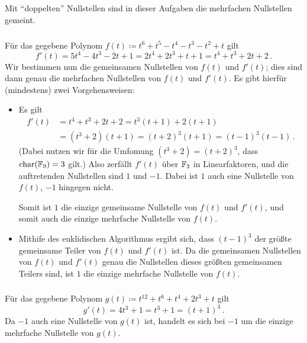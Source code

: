 \subsection{}

Mit \enquote{doppelten} Nullstellen sind in dieser Aufgaben die mehrfachen Nullstellen gemeint.



\subsubsection{}

Für das gegebene Polynom $f(t) \coloneqq t^6 + t^5 - t^4 - t^3 - t^2 + t$ gilt
\[
    f'(t)
  = 5 t^4 - 4 t^3 - 2 t + 1
  = 2 t^4 + 2 t^3 + t + 1
  = t^4 + t^3 + 2 t + 2 \,.
\]
Wir bestimmen nun die gemeinsamen Nullstellen von $f(t)$ und $f'(t)$;
dies sind dann genau die mehrfachen Nullstellen von $f(t)$ und $f'(t)$.
Es gibt hierfür (mindestens) zwei Vorgehensweisen:

\begin{itemize}
  \item
    Es gilt
    \begin{align*}
          f'(t)
      &=  t^4 + t^3 + 2 t + 2
       =  t^3 (t+1) + 2 (t+1) \\
      &=  (t^3 + 2)(t + 1)
       =  (t + 2)^3 (t + 1)
       =  (t - 1)^3 (t - 1) \,.
    \end{align*}
    (Dabei nutzen wir für die Umfomung $(t^3 + 2) = (t+2)^3$, dass $\operatorname{char}(\mathbb{F}_{9}) = 3$ gilt.)
    Also zerfällt $f'(t)$ über $\mathbb{F}_{3}$ in Linearfaktoren, und die auftretenden Nullstellen sind $1$ und $-1$.
    Dabei ist $1$ auch eine Nullstelle von $f(t)$, $-1$ hingegen nicht.
    
    Somit ist $1$ die einzige gemeinsame Nullstelle von $f(t)$ und $f'(t)$, und somit auch die einzige mehrfache Nullstelle von $f(t)$.
  \item
    Mithife des euklidischen Algorithmus ergibt sich, dass $(t-1)^3$ der größte gemeinsame Teiler von $f(t)$ und $f'(t)$ ist.
    Da die gemeinsamen Nullstellen von $f(t)$ und $f'(t)$ genau die Nullstellen dieses größten gemeinsamen Teilers sind, ist $1$ die einzige mehrfache Nullstelle von $f(t)$.
\end{itemize}



\subsubsection{}

Für das gegebene Polynom $g(t) \coloneqq t^{12} + t^6 + t^4 + 2 t^3 + t$ gilt
\[
    g'(t)
  = 4 t^3 + 1
  = t^3 + 1
  = (t + 1)^3 \,.
\]
Da $-1$ auch eine Nullstelle von $g(t)$ ist, handelt es sich bei $-1$ um die einzige mehrfache Nullstelle von $g(t)$.






